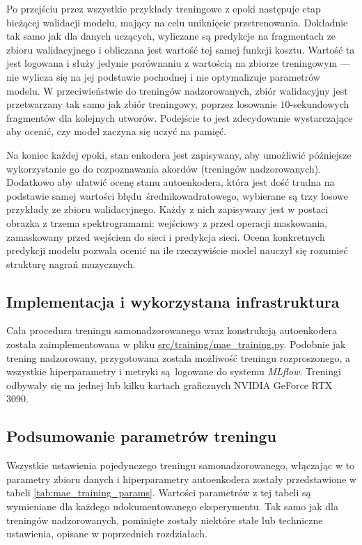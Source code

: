 Po przejściu przez wszystkie przykłady treningowe z epoki następuje etap bieżącej walidacji modelu, mający na celu uniknięcie przetrenowania. Dokładnie tak samo jak dla danych uczących, wyliczane są predykcje na fragmentach ze zbioru walidacyjnego i obliczana jest wartość tej samej funkcji kosztu.  Wartość ta jest logowana i służy jedynie porównaniu z wartością na zbiorze treningowym --- nie wylicza się na jej podstawie pochodnej i nie optymalizuje parametrów modelu. W przeciwieństwie do treningów nadzorowanych, zbiór walidacyjny jest przetwarzany tak samo jak zbiór treningowy, poprzez losowanie $10$-sekundowych fragmentów dla kolejnych utworów. Podejście to jest zdecydowanie wystarczające aby ocenić, czy model zaczyna się uczyć na pamięć.

Na koniec każdej epoki, stan enkodera jest zapisywany, aby umożliwić późniejsze wykorzystanie go do rozpoznawania akordów (treningów nadzorowanych). Dodatkowo aby ułatwić ocenę stanu autoenkodera, która jest dość trudna na podstawie samej wartości błędu średnikowadratowego, wybierane są trzy losowe przykłady ze zbioru walidacyjnego. Każdy z nich zapisywany jest w postaci obrazka z trzema spektrogramami: wejściowy z przed operacji maskowania, zamaskowany przed wejściem do sieci i predykcja sieci. Ocena konkretnych predykcji modelu pozwala ocenić na ile rzeczywiście model nauczył się rozumieć strukturę nagrań muzycznych.

\subsection{Implementacja i wykorzystana infrastruktura}

Cała procedura treningu samonadzorowanego wraz konstrukcją autoenkodera została zaimplementowana w pliku \url{src/training/mae_training.py}. Podobnie jak trening nadzorowany, przygotowana zostala możliwość treningu rozproszonego, a wszystkie hiperparametry i metryki są logowane do systemu \emph{MLflow}. Treningi odbywały się na jednej lub kilku kartach graficznych NVIDIA GeForce RTX 3090.

\subsection{Podsumowanie parametrów treningu}

Wszystkie ustawienia pojedynczego treningu samonadzorowanego, włączając w to parametry zbioru danych i hiperparametry autoenkodera zostały przedstawione w tabeli \ref{tab:mae_training_params}.  Wartości parametrów z tej tabeli są wymieniane dla każdego udokumentowanego eksperymentu. Tak samo jak dla treningów nadzorowanych, pominięte zostały niektóre stałe lub techniczne ustawienia, opisane w poprzednich rozdziałach. 


